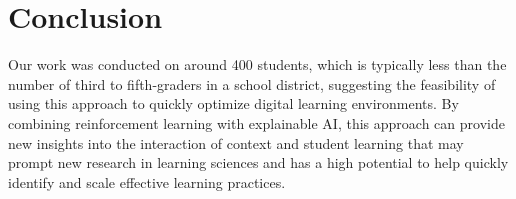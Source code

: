 \documentclass[sn-mathphys,Numbered]{sn-jnl}%
\theoremstyle{thmstyleone}%
\theoremstyle{thmstyletwo}%
\theoremstyle{thmstylethree}%
\begin{document}
\section{Conclusion}\label{sec13}

Our work was conducted on around 400 students, which is typically less than the number of third to fifth-graders in a school district, suggesting the feasibility of using this approach to quickly optimize digital learning environments. 
By combining reinforcement learning with explainable AI, this approach can provide new insights into the interaction of context and student learning that may prompt new research in learning sciences and has a high potential to help quickly identify and scale effective learning practices. 

\backmatter
\end{document}
